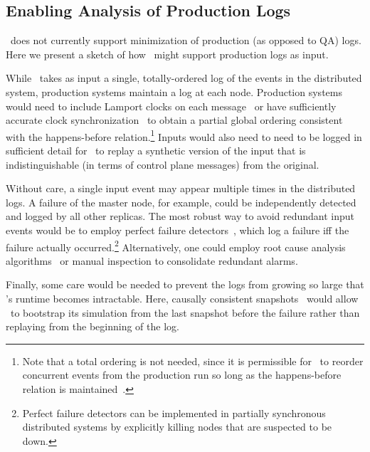 \subsection{Enabling Analysis of Production Logs}

\projectname~does not currently support minimization of production (as opposed
to QA) logs.
Here we present a sketch of how \projectname~might support production logs as input.

While \simulator~takes as input a single, totally-ordered log of the events in the
distributed system, production systems maintain a log at each node.
Production systems would need to include Lamport
clocks on each message~\cite{Lamport:1978:TCO:359545.359563} or have
sufficiently accurate clock
synchronization~\cite{corbett2012spanner} to obtain a partial global ordering
consistent with the happens-before relation.\footnote{
Note that a total ordering is not needed, since it is permissible
for \simulator~to reorder concurrent events from
the production run so long as the happens-before relation is
maintained~\cite{Fischer:1985:IDC:3149.214121}.}
Inputs would also need to need to be logged in sufficient detail for \projectname~to
replay a synthetic version of the input that is indistinguishable (in terms
of control plane messages) from the original.

Without care, a single input event may appear multiple times in the
distributed logs. A failure of the master node, for example, could be independently
detected and logged by all other replicas. The most robust way to
avoid redundant input events would be to employ perfect failure
detectors~\cite{chandra1996unreliable}, which log a failure iff
the failure actually occurred.\footnote{Perfect failure detectors can be
implemented in partially synchronous distributed systems by explicitly killing
nodes that are suspected to be down.} %
Alternatively, one
could employ root cause analysis
algorithms~\cite{yemini1996} or manual inspection to consolidate redundant
alarms.

Finally, some care would be needed to prevent the logs from growing so large that
\simulator's runtime becomes intractable. Here, causally consistent
snapshots~\cite{Chandy:1985:DSD:214451.214456} would allow \projectname~to
bootstrap its simulation from the last snapshot before the failure rather than
replaying from the beginning of the log.

